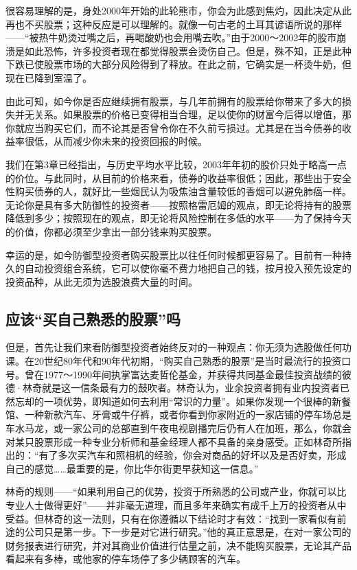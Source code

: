 \documentclass[12pt,oneside]{book}
\begin{document}
很容易理解的是，身处2000年开始的此轮熊市，你会为此感到焦灼，因此决定从此再也不买股票；这种反应是可以理解的。就像一句古老的土耳其谚语所说的那样——“被热牛奶烫过嘴之后，再喝酸奶也会用嘴去吹。”由于2000～2002年的股市崩溃是如此恐怖，许多投资者现在都觉得股票会烫伤自己。但是，殊不知，正是此种下跌已使股票市场的大部分风险得到了释放。在此之前，它确实是一杯烫牛奶，但现在已降到室温了。

由此可知，如今你是否应继续拥有股票，与几年前拥有的股票给你带来了多大的损失并无关系。如果股票的价格已变得相当合理，足以使你的财富今后得以增值，那你就应当购买它们，而不论其是否曾令你在不久前亏损过。尤其是在当今债券的收益率很低，从而减少你未来的投资回报的时候。

我们在第3章已经指出，与历史平均水平比较，2003年年初的股价只处于略高一点的价位。与此同时，从目前的价格来看，债券的收益率很低；因此，那些出于安全性购买债券的人，就好比一些烟民认为吸焦油含量较低的香烟可以避免肺癌一样。无论你是具有多大防御性的投资者——按照格雷厄姆的观点，即无论将持有的股票降低到多少；按照现在的观点，即无论将风险控制在多低的水平——为了保持今天的价值，你都必须至少拿出一部分钱来购买股票。

幸运的是，如今防御型投资者购买股票比以往任何时候都更容易了。目前有一种持久的自动投资组合系统，它可以使你毫不费力地把自己的钱，按月投入预先设定的投资品种，从此无须为选股浪费大量的时间。

\subsection{应该“买自己熟悉的股票”吗}
但是，首先让我们来看防御型投资者始终反对的一种观点：你无须为选股做任何功课。在20世纪80年代和90年代初期，“购买自己熟悉的股票”是当时最流行的投资口号。曾在1977～1990年间执掌富达麦哲伦基金，并获得共同基金最佳投资战绩的彼德·林奇就是这一信条最有力的鼓吹者。林奇认为，业余投资者拥有业内投资者已然忘却的一项优势，即知道如何去利用“常识的力量”。如果你发现一个很棒的新餐馆、一种新款汽车、牙膏或牛仔裤，或者你看到你家附近的一家店铺的停车场总是车水马龙，或一家公司的总部直到午夜电视剧播完后仍有人在加班，那么，你就会对某只股票形成一种专业分析师和基金经理人都不具备的亲身感受。正如林奇所指出的：“有了多次买汽车和照相机的经验，你会对商品的好坏以及是否好卖，形成自己的感觉……最重要的是，你比华尔街更早获知这一信息。”

林奇的规则——“如果利用自己的优势，投资于所熟悉的公司或产业，你就可以比专业人士做得更好”——并非毫无道理，而且多年来确实有成千上万的投资者从中受益。但林奇的这一法则，只有在你遵循以下结论时才有效：“找到一家看似有前途的公司只是第一步。下一步是对它进行研究。”他的真正意思是，在对一家公司的财务报表进行研究，并对其商业价值进行估量之前，决不能购买股票，无论其产品看起来有多棒，或他家的停车场停了多少辆顾客的汽车。
\end{document}
